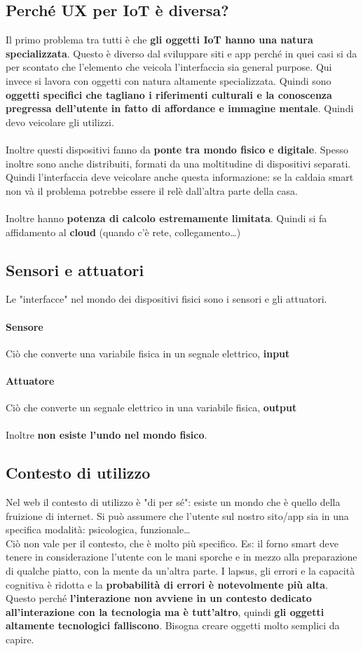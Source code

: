 \documentclass[10pt]{article}
\begin{document}
\subsection{Perché UX per IoT è diversa?}
Il primo problema tra tutti è che \textbf{gli oggetti IoT hanno una natura specializzata}. Questo è diverso dal sviluppare siti e app perché in quei casi si da per scontato che l'elemento che veicola l'interfaccia sia general purpose. Qui invece si lavora con oggetti con natura altamente specializzata. Quindi sono \textbf{oggetti specifici che tagliano i riferimenti culturali e la conoscenza pregressa dell'utente in fatto di affordance e immagine mentale}. Quindi devo veicolare gli utilizzi.\\\\
Inoltre questi dispositivi fanno da \textbf{ponte tra mondo fisico e digitale}. Spesso inoltre sono anche distribuiti, formati da una moltitudine di dispositivi separati. Quindi l'interfaccia deve veicolare anche questa informazione: se la caldaia smart non và il problema potrebbe essere il relè dall'altra parte della casa.\\\\
Inoltre hanno \textbf{potenza di calcolo estremamente limitata}. Quindi si fa affidamento al \textbf{cloud} (quando c'è rete, collegamento\ldots)
\subsection{Sensori e attuatori}
Le "interfacce" nel mondo dei dispositivi fisici sono i sensori e gli attuatori.
\paragraph{Sensore} Ciò che converte una variabile fisica in un segnale elettrico, \textbf{input}
\paragraph{Attuatore} Ciò che converte un segnale elettrico in una variabile fisica, \textbf{output}
\paragraph{} Inoltre \textbf{non esiste l'undo nel mondo fisico}.
\subsection{Contesto di utilizzo}
Nel web il contesto di utilizzo è "di per sé": esiste un mondo che è quello della fruizione di internet. Si può assumere che l'utente sul nostro sito/app sia in una specifica modalità: psicologica, funzionale\ldots\\
Ciò non vale per il contesto, che è molto più specifico. Es: il forno smart deve tenere in considerazione l'utente con le mani sporche e in mezzo alla preparazione di qualche piatto, con la mente da un'altra parte. I lapsus, gli errori e la capacità cognitiva è ridotta e la \textbf{probabilità di errori è notevolmente più alta}. Questo perché \textbf{l'interazione non avviene in un contesto dedicato all'interazione con la tecnologia ma è tutt'altro}, quindi \textbf{gli oggetti altamente tecnologici falliscono}. Bisogna creare oggetti molto semplici da capire.
\end{document}
